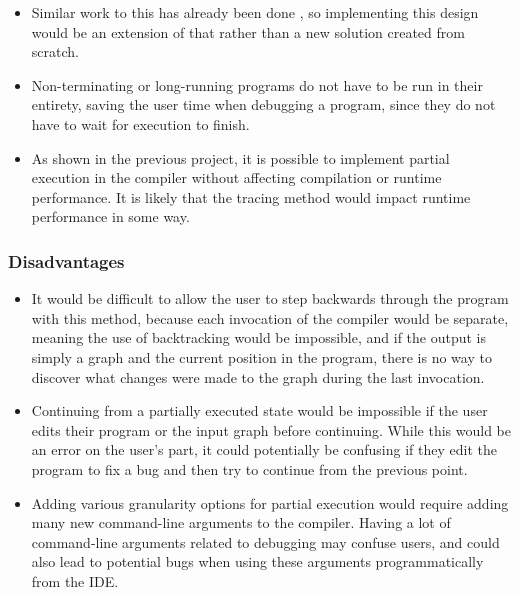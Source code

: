 \documentclass[authoryearcitations]{UoYCSproject}
\begin{document}
\begin{itemize}
    \item Similar work to this has already been done \citep{taylor2016}, so
          implementing this design would be an extension of that rather than a
          new solution created from scratch.

    \item Non-terminating or long-running programs do not have to be run in their
          entirety, saving the user time when debugging a program, since they do
          not have to wait for execution to finish.

    \item As shown in the previous project, it is possible to implement partial
          execution in the compiler without affecting compilation or runtime
          performance. It is likely that the tracing method would impact runtime
          performance in some way.
\end{itemize}


\subsubsection{Disadvantages}
\label{sec:ProposedDesign1Disadvantages}

\begin{itemize}
    \item It would be difficult to allow the user to step backwards through the
          program with this method, because each invocation of the compiler
          would be separate, meaning the use of backtracking would be impossible,
          and if the output is simply a graph and the current position in the
          program, there is no way to discover what changes were made to the graph
          during the last invocation.

    \item Continuing from a partially executed state would be impossible if the
          user edits their program or the input graph before continuing. While
          this would be an error on the user's part, it could potentially be
          confusing if they edit the program to fix a bug and then try to continue
          from the previous point.

    \item Adding various granularity options for partial execution would require
          adding many new command-line arguments to the compiler. Having a lot
          of command-line arguments related to debugging may confuse users, and
          could also lead to potential bugs when using these arguments
          programmatically from the IDE.
\end{itemize}
\end{document}
